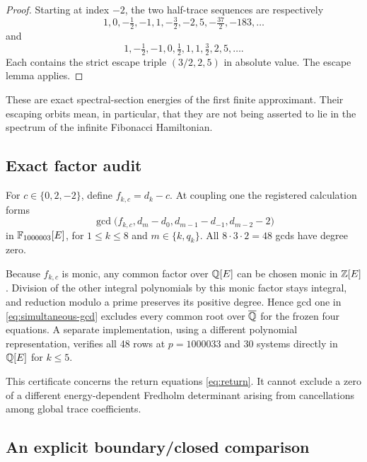 \begin{proof}
Starting at index \(-2\), the two half-trace sequences are respectively
\[
1,0,-\tfrac12,-1,1,-\tfrac32,-2,5,-\tfrac{37}{2},-183,\ldots
\]
and
\[
1,-\tfrac12,-1,0,\tfrac12,1,1,\tfrac32,2,5,\ldots.
\]
Each contains the strict escape triple
\((3/2,2,5)\) in absolute value.  The escape lemma applies.
\end{proof}

These are exact spectral-section energies of the first finite approximant.
Their escaping orbits mean, in particular, that they are not being asserted
to lie in the spectrum of the infinite Fibonacci Hamiltonian.

\subsection{Exact factor audit}

For \(c\in\{0,2,-2\}\), define \(f_{k,c}=d_k-c\).  At coupling one the
registered calculation forms
\begin{equation}
\gcd\bigl(f_{k,c},d_m-d_0,d_{m-1}-d_{-1},d_{m-2}-2\bigr)
\label{eq:simultaneous-gcd}
\end{equation}
in \(\mathbb F_{1000003}[E]\), for \(1\le k\le8\) and
\(m\in\{k,q_k\}\).  All \(8\cdot3\cdot2=48\) gcds have degree zero.

Because \(f_{k,c}\) is monic, any common factor over \(\mathbb Q[E]\) can be chosen
monic in \(\mathbb Z[E]\).  Division of the other integral polynomials by this monic
factor stays integral, and reduction modulo a prime preserves its positive
degree.  Hence gcd one in \eqref{eq:simultaneous-gcd} excludes every common
root over \(\overline{\mathbb Q}\) for the frozen four equations.  A separate
implementation, using a different polynomial representation, verifies all 48
rows at \(p=1000033\) and 30 systems directly in \(\mathbb Q[E]\) for \(k\le5\).

This certificate concerns the return equations \eqref{eq:return}.  It cannot
exclude a zero of a different energy-dependent Fredholm determinant arising
from cancellations among global trace coefficients.

\subsection{An explicit boundary/closed comparison}

